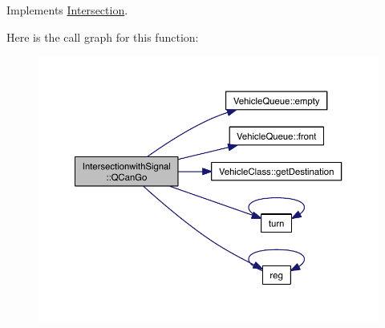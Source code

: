 Implements \hyperlink{class_intersection_ade54ec591355782db542061623096a2f}{Intersection}.



Here is the call graph for this function\-:
\nopagebreak
\begin{figure}[H]
\begin{center}
\leavevmode
\includegraphics[width=350pt]{class_intersectionwith_signal_a3b2a6f1e258fcd15828ffb7e9e9881b3_cgraph}
\end{center}
\end{figure}




